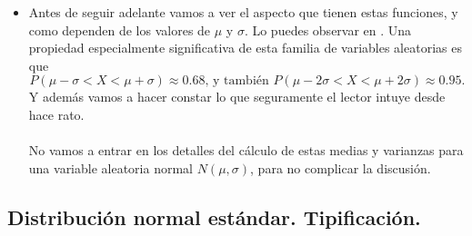 \begin{itemize}
\item  Antes de seguir adelante vamos a ver el aspecto que tienen estas funciones, y como dependen de los valores de $\mu$ y $\sigma$. Lo puedes observar en . Una propiedad especialmente significativa de esta familia de variables aleatorias es que
    \[P(\mu-\sigma<X<\mu+\sigma)\approx 0.68\mbox{, y también }P(\mu-2\sigma<X<\mu+2\sigma)\approx 0.95.\]
    Y además vamos a hacer constar lo que seguramente el lector intuye desde hace rato.\\[3mm]
       \\[3mm]
    No vamos a entrar en los detalles del cálculo de estas medias y varianzas para una variable aleatoria normal $N(\mu,\sigma)$, para no complicar la discusión.

\end{itemize}

\subsection{Distribución normal estándar. Tipificación.}

